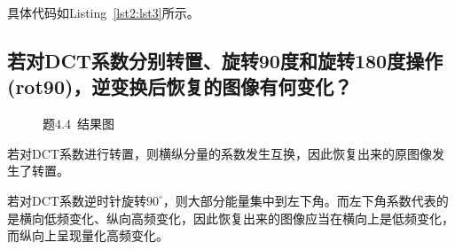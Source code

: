 \documentclass[a4paper]{article}
\begin{document}
	具体代码如Listing~\ref{lst2:lst3}所示。
	
	
	
	\subsection{若对DCT系数分别转置、旋转90度和旋转180度操作(rot90)，逆变换后恢复的图像有何变化？}
	
		\begin{figure}[b]
			\centering
			\hspace{0.75cm}
			\hspace{0.75cm}
			\hspace{0.75cm}
			\caption{题4.4~结果图}
			\label{fig3}
		\end{figure}
	若对DCT系数进行转置，则横纵分量的系数发生互换，因此恢复出来的原图像发生了转置。
	
	若对DCT系数逆时针旋转$90^\circ$，则大部分能量集中到左下角。而左下角系数代表的是横向低频变化、纵向高频变化，因此恢复出来的图像应当在横向上是低频变化，而纵向上呈现量化高频变化。
	
\end{document}
